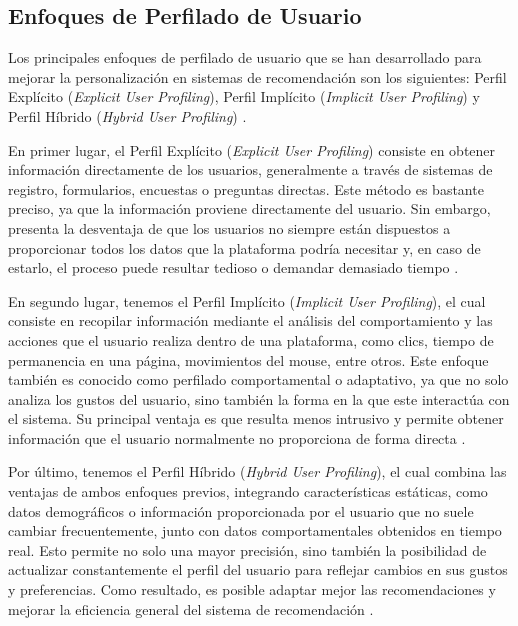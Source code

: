 \subsection{Enfoques de Perfilado de Usuario}\label{subsec:enfoques_perfilado}

Los principales enfoques de perfilado de usuario que se han desarrollado para mejorar la personalización en sistemas de recomendación son los siguientes: Perfil Explícito (\emph{Explicit User Profiling}), Perfil Implícito (\emph{Implicit User Profiling}) y Perfil Híbrido (\emph{Hybrid User Profiling}) \parencite{KanojeEtAl2014}.

En primer lugar, el Perfil Explícito (\emph{Explicit User Profiling}) consiste en obtener información directamente de los usuarios, generalmente a través de sistemas de registro, formularios, encuestas o preguntas directas. Este método es bastante preciso, ya que la información proviene directamente del usuario. Sin embargo, presenta la desventaja de que los usuarios no siempre están dispuestos a proporcionar todos los datos que la plataforma podría necesitar y, en caso de estarlo, el proceso puede resultar tedioso o demandar demasiado tiempo \parencite{EkeEtAl2019}.

En segundo lugar, tenemos el Perfil Implícito (\emph{Implicit User Profiling}), el cual consiste en recopilar información mediante el análisis del comportamiento y las acciones que el usuario realiza dentro de una plataforma, como clics, tiempo de permanencia en una página, movimientos del mouse, entre otros. Este enfoque también es conocido como perfilado comportamental o adaptativo, ya que no solo analiza los gustos del usuario, sino también la forma en la que este interactúa con el sistema. Su principal ventaja es que resulta menos intrusivo y permite obtener información que el usuario normalmente no proporciona de forma directa \parencite{KanojeEtAl2014}.

Por último, tenemos el Perfil Híbrido (\emph{Hybrid User Profiling}), el cual combina las ventajas de ambos enfoques previos, integrando características estáticas, como datos demográficos o información proporcionada por el usuario que no suele cambiar frecuentemente, junto con datos comportamentales obtenidos en tiempo real. Esto permite no solo una mayor precisión, sino también la posibilidad de actualizar constantemente el perfil del usuario para reflejar cambios en sus gustos y preferencias. Como resultado, es posible adaptar mejor las recomendaciones y mejorar la eficiencia general del sistema de recomendación \parencite{KanojeEtAl2014}.

